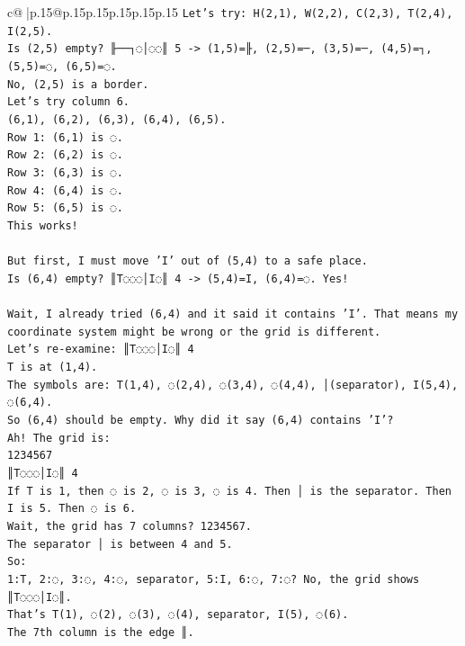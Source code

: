 \documentclass{article}
\begin{document}
{\begin{supertabular}{c@{$\;$}|p{.15\linewidth}@{}p{.15\linewidth}p{.15\linewidth}p{.15\linewidth}p{.15\linewidth}p{.15\linewidth}}
{{{\texttt{Let's try: H(2,1), W(2,2), C(2,3), T(2,4), I(2,5).} \\
\texttt{Is (2,5) empty? ╟──┐◌│◌◌║ 5 {-}> (1,5)=╟, (2,5)=─, (3,5)=─, (4,5)=┐, (5,5)=◌, (6,5)=◌.} \\
\texttt{No, (2,5) is a border.} \\
\texttt{Let's try column 6.} \\
\texttt{(6,1), (6,2), (6,3), (6,4), (6,5).} \\
\texttt{Row 1: (6,1) is ◌.} \\
\texttt{Row 2: (6,2) is ◌.} \\
\texttt{Row 3: (6,3) is ◌.} \\
\texttt{Row 4: (6,4) is ◌.} \\
\texttt{Row 5: (6,5) is ◌.} \\
\texttt{This works!} \\
\\ 
\texttt{But first, I must move 'I' out of (5,4) to a safe place.} \\
\texttt{Is (6,4) empty? ║T◌◌◌│I◌║ 4 {-}> (5,4)=I, (6,4)=◌. Yes!} \\
\\ 
\texttt{Wait, I already tried (6,4) and it said it contains 'I'. That means my coordinate system might be wrong or the grid is different.} \\
\texttt{Let's re{-}examine: ║T◌◌◌│I◌║ 4} \\
\texttt{T is at (1,4).} \\
\texttt{The symbols are: T(1,4), ◌(2,4), ◌(3,4), ◌(4,4), │(separator), I(5,4), ◌(6,4).} \\
\texttt{So (6,4) should be empty. Why did it say (6,4) contains 'I'?} \\
\texttt{Ah! The grid is:} \\
\texttt{1234567} \\
\texttt{║T◌◌◌│I◌║ 4} \\
\texttt{If T is 1, then ◌ is 2, ◌ is 3, ◌ is 4. Then │ is the separator. Then I is 5. Then ◌ is 6.} \\
\texttt{Wait, the grid has 7 columns? 1234567.} \\
\texttt{The separator │ is between 4 and 5.} \\
\texttt{So:} \\
\texttt{1:T, 2:◌, 3:◌, 4:◌, separator, 5:I, 6:◌, 7:◌? No, the grid shows ║T◌◌◌│I◌║.} \\
\texttt{That's T(1), ◌(2), ◌(3), ◌(4), separator, I(5), ◌(6).} \\
\texttt{The 7th column is the edge ║.} \\
}}}
\end{supertabular}}
\end{document}
